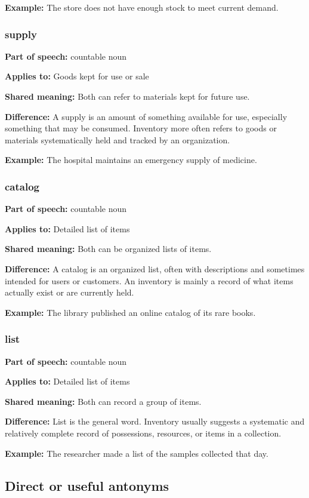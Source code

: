 \documentclass[11pt]{article}
\begin{document}
\textbf{Example:} The store does not have enough stock to meet current demand.

\subsubsection{supply}
\textbf{Part of speech:} countable noun

\textbf{Applies to:} Goods kept for use or sale

\textbf{Shared meaning:} Both can refer to materials kept for future use.

\textbf{Difference:} A supply is an amount of something available for use, especially something that may be consumed. Inventory more often refers to goods or materials systematically held and tracked by an organization.

\textbf{Example:} The hospital maintains an emergency supply of medicine.

\subsubsection{catalog}
\textbf{Part of speech:} countable noun

\textbf{Applies to:} Detailed list of items

\textbf{Shared meaning:} Both can be organized lists of items.

\textbf{Difference:} A catalog is an organized list, often with descriptions and sometimes intended for users or customers. An inventory is mainly a record of what items actually exist or are currently held.

\textbf{Example:} The library published an online catalog of its rare books.

\subsubsection{list}
\textbf{Part of speech:} countable noun

\textbf{Applies to:} Detailed list of items

\textbf{Shared meaning:} Both can record a group of items.

\textbf{Difference:} List is the general word. Inventory usually suggests a systematic and relatively complete record of possessions, resources, or items in a collection.

\textbf{Example:} The researcher made a list of the samples collected that day.

\subsection{Direct or useful antonyms}
\end{document}
